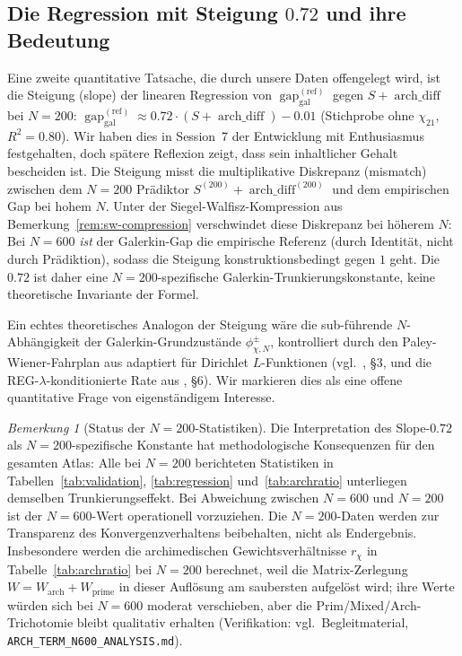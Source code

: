 \documentclass[a4paper,10pt,twocolumn]{article}
\theoremstyle{definition}
\theoremstyle{remark}
\newtheorem{remark}[theorem]{Bemerkung}
\newcommand{\gap}{\operatorname{gap}}
\newcommand{\chifn}{\chi}
\newcommand{\archdiff}{\operatorname{arch\_diff}}
\begin{document}
\subsection{\texorpdfstring{Die Regression mit Steigung $0.72$ und ihre Bedeutung}{Die Regression mit Steigung 0.72 und ihre Bedeutung}}
\label{sec:discussion-slope}

Eine zweite quantitative Tatsache, die durch unsere Daten offengelegt wird, ist die Steigung (slope)
der linearen Regression von $\gap_{\mathrm{gal}}^{(\mathrm{ref})}$ gegen
$S+\archdiff$ bei $N=200$:
$\gap_{\mathrm{gal}}^{(\mathrm{ref})}\approx 0.72\cdot(S+\archdiff)-0.01$
(Stichprobe ohne $\chifn_{21}$, $R^2=0.80$). Wir haben dies in Session~7 der
Entwicklung mit Enthusiasmus festgehalten, doch spätere Reflexion zeigt, dass
sein inhaltlicher Gehalt bescheiden ist. Die Steigung misst die multiplikative
Diskrepanz (mismatch) zwischen dem $N=200$ Prädiktor $S^{(200)}+\archdiff^{(200)}$
und dem empirischen Gap bei hohem $N$. Unter der Siegel-Walfisz-Kompression
aus Bemerkung~\ref{rem:sw-compression} verschwindet diese Diskrepanz
bei höherem $N$: Bei $N=600$ \emph{ist} der Galerkin-Gap
die empirische Referenz (durch Identität, nicht durch Prädiktion), sodass die
Steigung konstruktionsbedingt gegen $1$ geht. Die $0.72$ ist daher eine
$N=200$-spezifische Galerkin-Trunkierungskonstante, keine theoretische
Invariante der Formel.

Ein echtes theoretisches Analogon der Steigung wäre die
sub-führende $N$-Abhängigkeit der Galerkin-Grundzustände
$\phi^\pm_{\chifn,N}$, kontrolliert durch den Paley-Wiener-Fahrplan aus
\cite{RH_II} adaptiert für Dirichlet $L$-Funktionen (vgl.\
\cite{AnalyticGroundstate}, \S3, und die REG-$\lambda$-konditionierte
Rate aus \cite{RH_II}, \S6). Wir markieren dies als eine offene quantitative
Frage von eigenständigem Interesse.

\begin{remark}[Status der $N=200$-Statistiken]
\label{rem:n200-status}
Die Interpretation des Slope-$0.72$ als $N=200$-spezifische Konstante
hat methodologische Konsequenzen für den gesamten Atlas: Alle bei $N=200$
berichteten Statistiken in Tabellen~\ref{tab:validation},
\ref{tab:regression} und~\ref{tab:archratio} unterliegen demselben
Trunkierungseffekt. Bei Abweichung zwischen $N=600$ und $N=200$ ist der
$N=600$-Wert operationell vorzuziehen. Die $N=200$-Daten werden zur
Transparenz des Konvergenzverhaltens beibehalten, nicht als Endergebnis.
Insbesondere werden die archimedischen Gewichtsverhältnisse $r_\chi$
in Tabelle~\ref{tab:archratio} bei $N=200$ berechnet, weil die
Matrix-Zerlegung $W=W_{\mathrm{arch}}+W_{\mathrm{prime}}$ in dieser
Auflösung am saubersten aufgelöst wird; ihre Werte würden sich bei
$N=600$ moderat verschieben, aber die Prim/Mixed/Arch-Trichotomie
bleibt qualitativ erhalten (Verifikation: vgl.\ Begleitmaterial,
\texttt{ARCH\_TERM\_N600\_ANALYSIS.md}).
\end{remark}
\end{document}
